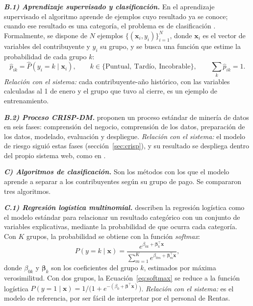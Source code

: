 \documentclass[12pt,a4paper]{report}
\begin{document}
\noindent\textbf{\textit{B.1) Aprendizaje supervisado y clasificación.}} En el aprendizaje supervisado el algoritmo aprende de ejemplos cuyo resultado ya se conoce; cuando ese resultado es una categoría, el problema es de clasificación \parencite{mitchell1997}. Formalmente, se dispone de $N$ ejemplos $\{(\mathbf{x}_i, y_i)\}_{i=1}^{N}$, donde $\mathbf{x}_i$ es el vector de variables del contribuyente y $y_i$ su grupo, y se busca una función que estime la probabilidad de cada grupo $k$:
\begin{equation}
\hat{p}_{ik}=\hat{P}(y_i=k\mid\mathbf{x}_i),\qquad k\in\{\text{Puntual},\ \text{Tardío},\ \text{Incobrable}\},\qquad \sum_{k}\hat{p}_{ik}=1.
\label{eq:proba}
\end{equation}
\textit{Relación con el sistema:} cada contribuyente-año histórico, con las variables calculadas al 1 de enero y el grupo que tuvo al cierre, es un ejemplo de entrenamiento.

\noindent\textbf{\textit{B.2) Proceso CRISP-DM.}} \textcite{chapman2000} proponen un proceso estándar de minería de datos en seis fases: comprensión del negocio, comprensión de los datos, preparación de los datos, modelado, evaluación y despliegue. \textit{Relación con el sistema:} el modelo de riesgo siguió estas fases (sección~\ref{sec:crisp}), y su resultado se despliega dentro del propio sistema web, como en \textcite{encalada2025}.

\noindent\textbf{\textit{C) Algoritmos de clasificación.}} Son los métodos con los que el modelo aprende a separar a los contribuyentes según su grupo de pago. Se compararon tres algoritmos.

\noindent\textbf{\textit{C.1) Regresión logística multinomial.}} \textcite{hosmer2013} describen la regresión logística como el modelo estándar para relacionar un resultado categórico con un conjunto de variables explicativas, mediante la probabilidad de que ocurra cada categoría. Con $K$ grupos, la probabilidad se obtiene con la función \textit{softmax}:
\begin{equation}
P(y=k\mid\mathbf{x})=\frac{e^{\beta_{0k}+\boldsymbol{\beta}_{k}^{\top}\mathbf{x}}}{\sum_{m=1}^{K}e^{\beta_{0m}+\boldsymbol{\beta}_{m}^{\top}\mathbf{x}}},
\label{eq:softmax}
\end{equation}
donde $\beta_{0k}$ y $\boldsymbol{\beta}_{k}$ son los coeficientes del grupo $k$, estimados por máxima verosimilitud. Con dos grupos, la Ecuación~\eqref{eq:softmax} se reduce a la función logística $P(y=1\mid\mathbf{x})=1/\bigl(1+e^{-(\beta_0+\boldsymbol{\beta}^{\top}\mathbf{x})}\bigr)$. \textit{Relación con el sistema:} es el modelo de referencia, por ser fácil de interpretar por el personal de Rentas.
\end{document}
